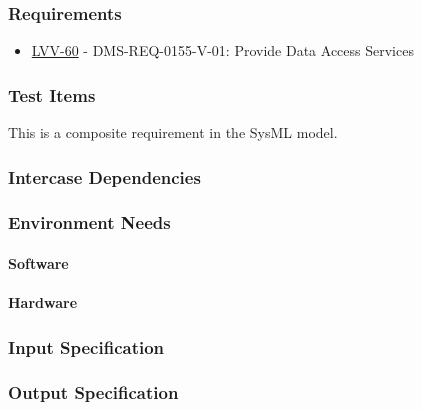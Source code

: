 \subsubsection{Requirements}
\begin{itemize}
\item \href{https://jira.lsstcorp.org/browse/LVV-60}{LVV-60} - DMS-REQ-0155-V-01: Provide Data Access Services
\end{itemize}

\subsubsection{Test Items}
This is a composite requirement in the SysML model.



\subsubsection{Intercase Dependencies}

\subsubsection{Environment Needs}

\paragraph{Software}

\paragraph{Hardware}

\subsubsection{Input Specification}

\subsubsection{Output Specification}

